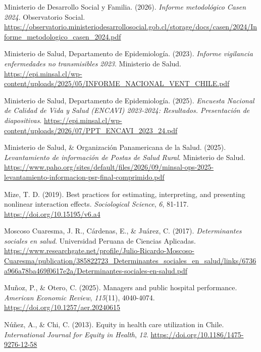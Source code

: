 \documentclass[
  spanish,
  a4paper,
  oneside]{scrbook}
\newlength{\cslhangindent}
\newenvironment{CSLReferences}[2] %
 {\begin{list}{}{%
  \setlength{\itemindent}{0pt}
  \setlength{\leftmargin}{0pt}
  \setlength{\parsep}{0pt}
  \ifodd #1
   \setlength{\leftmargin}{\cslhangindent}
   \setlength{\itemindent}{-1\cslhangindent}
  \fi
  \setlength{\itemsep}{#2\baselineskip}}}
 {\end{list}}
\begin{document}
\begin{CSLReferences}{1}{0}
Ministerio de Desarrollo Social y Familia. (2026). \emph{Informe
metodológico Casen 2024}. Observatorio Social.
\url{https://observatorio.ministeriodesarrollosocial.gob.cl/storage/docs/casen/2024/Informe_metodologico_casen_2024.pdf}

Ministerio de Salud, Departamento de Epidemiología. (2023).
\emph{Informe vigilancia enfermedades no transmisibles 2023}. Ministerio
de Salud.
\url{https://epi.minsal.cl/wp-content/uploads/2025/05/INFORME_NACIONAL_VENT_CHILE.pdf}

Ministerio de Salud, Departamento de Epidemiología. (2025).
\emph{Encuesta Nacional de Calidad de Vida y Salud ({ENCAVI}) 2023-2024:
Resultados. Presentación de diapositivas}.
\url{https://epi.minsal.cl/wp-content/uploads/2026/07/PPT_ENCAVI_2023_24.pdf}

Ministerio de Salud, \& Organización Panamericana de la Salud. (2025).
\emph{Levantamiento de información de Postas de Salud Rural}. Ministerio
de Salud.
\url{https://www.paho.org/sites/default/files/2026/09/minsal-ops-2025-levantamiento-informacion-psr-final-comprimido.pdf}

Mize, T. D. (2019). Best practices for estimating, interpreting, and
presenting nonlinear interaction effects. \emph{Sociological Science},
\emph{6}, 81-117. \url{https://doi.org/10.15195/v6.a4}

Moscoso Cuaresma, J. R., Cárdenas, E., \& Juárez, C. (2017).
\emph{Determinantes sociales en salud}. Universidad Peruana de Ciencias
Aplicadas.
\url{https://www.researchgate.net/profile/Julio-Ricardo-Moscoso-Cuaresma/publication/385822723_Determinantes_sociales_en_salud/links/6736a966a78ba469f0617e2a/Determinantes-sociales-en-salud.pdf}

Muñoz, P., \& Otero, C. (2025). Managers and public hospital
performance. \emph{American Economic Review}, \emph{115}(11), 4040-4074.
\url{https://doi.org/10.1257/aer.20240615}

Núñez, A., \& Chi, C. (2013). Equity in health care utilization in
{Chile}. \emph{International Journal for Equity in Health}, \emph{12}.
\url{https://doi.org/10.1186/1475-9276-12-58}


\end{CSLReferences}
\end{document}
